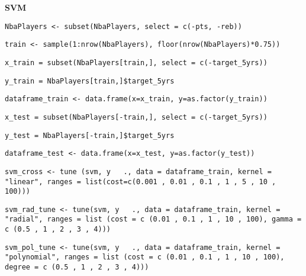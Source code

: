 \noindent
\textbf{SVM}

\texttt{NbaPlayers <- subset(NbaPlayers, select = c(-pts, -reb))}

\texttt{train <- sample(1:nrow(NbaPlayers), floor(nrow(NbaPlayers)*0.75))}

\texttt{x\_train = subset(NbaPlayers[train,], select = c(-target\_5yrs))}

\texttt{y\_train = NbaPlayers[train,]\$target\_5yrs}

\texttt{dataframe\_train <- data.frame(x=x\_train, y=as.factor(y\_train))}

\texttt{x\_test = subset(NbaPlayers[-train,], select = c(-target\_5yrs))}

\texttt{y\_test = NbaPlayers[-train,]\$target\_5yrs}

\texttt{dataframe\_test <- data.frame(x=x\_test, y=as.factor(y\_test))}

\texttt{svm\_cross <- tune (svm, y ~ ., data = dataframe\_train, kernel = "linear",
ranges = list(cost=c(0.001 , 0.01 , 0.1 , 1 , 5 , 10 , 100)))}

\texttt{svm\_rad\_tune <- tune(svm, y ~ ., data = dataframe\_train, kernel = "radial", ranges = list (cost = c (0.01 , 0.1 , 1 , 10 , 100), gamma = c (0.5 , 1 , 2 , 3 , 4)))}

\texttt{svm\_pol\_tune <- tune(svm, y ~ ., data = dataframe\_train, kernel = "polynomial", ranges = list (cost = c (0.01 , 0.1 , 1 , 10 , 100), degree = c (0.5 , 1 , 2 , 3 , 4)))}
